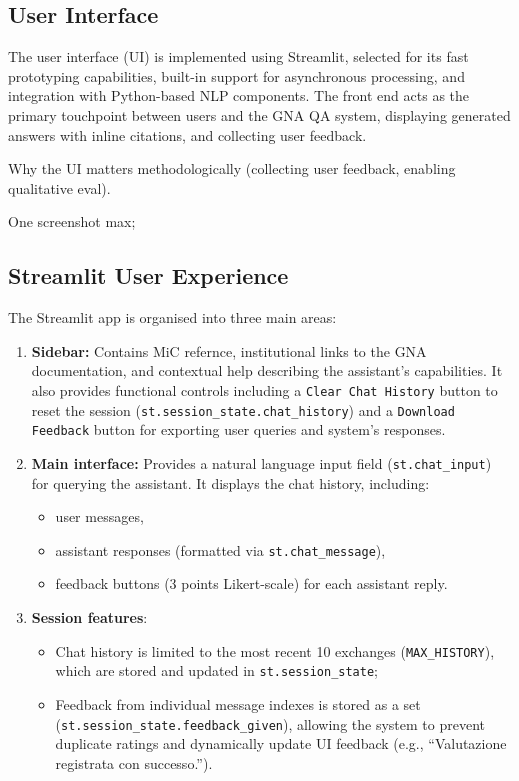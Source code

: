 \begin{spacing}{1.5}
\section{User Interface}
The user interface (UI) is implemented using Streamlit, selected for its fast prototyping capabilities, built-in support for asynchronous processing, and integration with Python-based NLP components. The front end acts as the primary touchpoint between users and the GNA QA system, displaying generated answers with inline citations, and collecting user feedback.

Why the UI matters methodologically (collecting user feedback, enabling qualitative eval).

One screenshot max;

\subsection{Streamlit User Experience}
The Streamlit app is organised into three main areas:
\begin{enumerate}
      \item \textbf{Sidebar:} Contains MiC refernce, institutional links to the GNA documentation, and contextual help describing the assistant’s capabilities. It also provides functional controls including a \texttt{Clear Chat History} button to reset the session (\texttt{st.session\_state.chat\_history}) and a \texttt{Download Feedback} button for exporting user queries and system's responses.
      \item \textbf{Main interface:} Provides a natural language input field (\texttt{st.chat\_input}) for querying the assistant. It displays the chat history, including:
      \begin{itemize}
            \item user messages,
            \item assistant responses (formatted via \texttt{st.chat\_message}),
            \item feedback buttons (3 points Likert-scale) for each assistant reply.
      \end{itemize}
      \item \textbf{Session features}: 
      \begin{itemize}
            \item Chat history is limited to the most recent 10 exchanges (\texttt{MAX\_HISTORY}), which are stored and updated in \texttt{st.session\_state};
            \item Feedback from individual message indexes is stored as a set (\texttt{st.session\_state.feedback\_given}), allowing the system to prevent duplicate ratings and dynamically update UI feedback (e.g., ``Valutazione registrata con successo.'').
      \end{itemize}
\end{enumerate}


\end{spacing}
